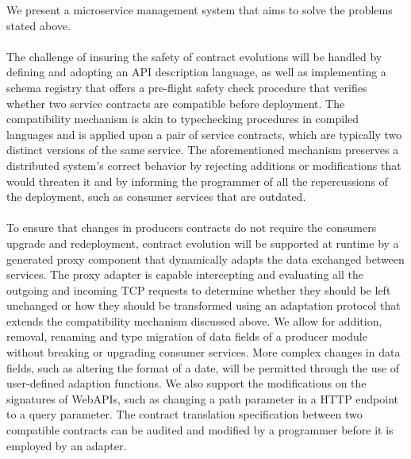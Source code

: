 We present a microservice management system that aims to solve the problems stated above.

\paragraph{}

The challenge of insuring the safety of contract evolutions will be handled by defining and adopting an API description language, as well as implementing a schema
registry that offers a pre-flight safety check procedure that verifies whether two service contracts are compatible before
deployment.
The compatibility mechanism is akin to typechecking procedures in compiled languages and is applied upon a
pair of service contracts, which are typically two distinct versions of the same service. The aforementioned mechanism preserves
a distributed system's correct behavior by rejecting additions or modifications that would threaten it and by informing the programmer
of all the repercussions of the deployment, such as consumer services that are outdated.

\paragraph{}

To ensure that changes in producers contracts do not require the consumers upgrade and redeployment, contract evolution
will be supported at runtime by a generated proxy component that dynamically adapts the data exchanged between services.
The proxy adapter is capable intercepting and evaluating all the outgoing and incoming TCP requests to determine whether
they should be left unchanged or how they should be transformed using an adaptation protocol that extends the compatibility mechanism discussed above.
We allow for addition, removal, renaming and type migration of data fields of a producer module without breaking or upgrading consumer services.
More complex changes in data fields, such as altering the format of a date, will be permitted through the use of user-defined adaption functions.
We also support the modifications on the signatures of WebAPIs, such as changing a path parameter in a HTTP endpoint to a query parameter.
The contract translation specification between two compatible contracts can be audited and modified by a programmer before it is employed by an adapter.

\paragraph{}

